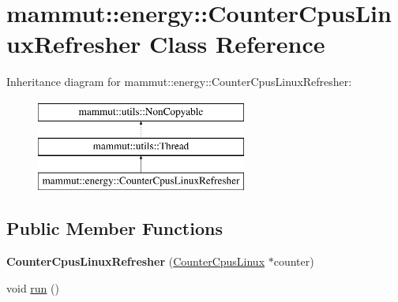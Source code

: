\hypertarget{classmammut_1_1energy_1_1CounterCpusLinuxRefresher}{\section{mammut\-:\-:energy\-:\-:Counter\-Cpus\-Linux\-Refresher Class Reference}
\label{classmammut_1_1energy_1_1CounterCpusLinuxRefresher}
}
Inheritance diagram for mammut\-:\-:energy\-:\-:Counter\-Cpus\-Linux\-Refresher\-:\begin{figure}[H]
\begin{center}
\leavevmode
\includegraphics[height=3.000000cm]{classmammut_1_1energy_1_1CounterCpusLinuxRefresher}
\end{center}
\end{figure}
\subsection*{Public Member Functions}
\begin{DoxyCompactItemize}
\item 
\hypertarget{classmammut_1_1energy_1_1CounterCpusLinuxRefresher_aad08a6b27e6091ee7698ac5fbe0fe3fc}{{\bfseries Counter\-Cpus\-Linux\-Refresher} (\hyperlink{classmammut_1_1energy_1_1CounterCpusLinux}{Counter\-Cpus\-Linux} $\ast$counter)}\label{classmammut_1_1energy_1_1CounterCpusLinuxRefresher_aad08a6b27e6091ee7698ac5fbe0fe3fc}

\item 
void \hyperlink{classmammut_1_1energy_1_1CounterCpusLinuxRefresher_a9037ed7260ba2eea4995ac35dc079eeb}{run} ()
\end{DoxyCompactItemize}


